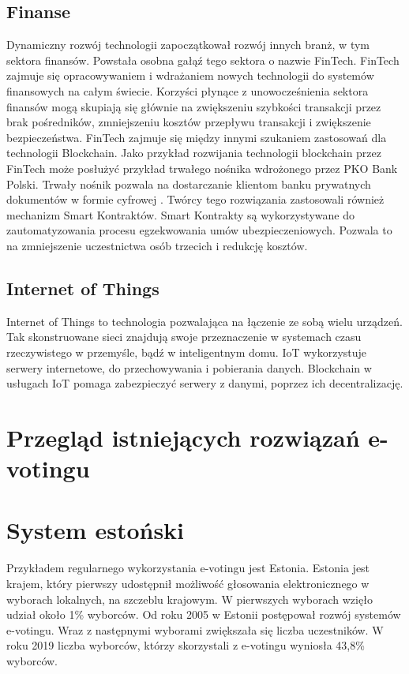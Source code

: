 \documentclass[a4paper,12pt]{book}
\begin{document}
\subsection{Finanse}

Dynamiczny rozwój technologii zapoczątkował rozwój innych branż, w tym sektora finansów. Powstała osobna gałąź tego sektora o nazwie FinTech. FinTech zajmuje się opracowywaniem i wdrażaniem nowych technologii do systemów finansowych na całym świecie. Korzyści płynące z unowocześnienia sektora finansów mogą skupiają się głównie na zwiększeniu szybkości transakcji przez brak pośredników, zmniejszeniu kosztów przepływu transakcji i zwiększenie bezpieczeństwa. FinTech zajmuje się między innymi szukaniem zastosowań dla technologii Blockchain. Jako przykład rozwijania technologii blockchain przez FinTech może posłużyć przykład trwałego nośnika wdrożonego przez PKO Bank Polski. Trwały nośnik pozwala na dostarczanie klientom banku prywatnych dokumentów w formie cyfrowej \cite{PKO}. Twórcy tego rozwiązania zastosowali również mechanizm Smart Kontraktów. Smart Kontrakty są wykorzystywane do zautomatyzowania procesu egzekwowania umów ubezpieczeniowych\cite{PKO-SMART}. Pozwala to na zmniejszenie uczestnictwa osób trzecich i redukcję kosztów.

\subsection{Internet of Things}

Internet of Things to technologia pozwalająca na łączenie ze sobą wielu urządzeń. Tak skonstruowane sieci znajdują swoje przeznaczenie w systemach czasu rzeczywistego w przemyśle, bądź w inteligentnym domu. IoT wykorzystuje serwery internetowe, do przechowywania i pobierania danych. Blockchain w usługach IoT pomaga zabezpieczyć serwery z danymi, poprzez ich decentralizację.

\newpage

\section{Przegląd istniejących rozwiązań e-votingu}
\section{System estoński}
Przykładem regularnego wykorzystania e-votingu jest Estonia. Estonia jest krajem, który pierwszy udostępnił możliwość głosowania elektronicznego w wyborach lokalnych, na szczeblu krajowym. W pierwszych wyborach wzięło udział około 1\% wyborców. Od roku 2005 w Estonii postępował rozwój systemów e-votingu. Wraz z następnymi wyborami zwiększała się liczba uczestników. W roku 2019 liczba wyborców, którzy skorzystali z e-votingu wyniosła 43,8\% wyborców.
\end{document}
